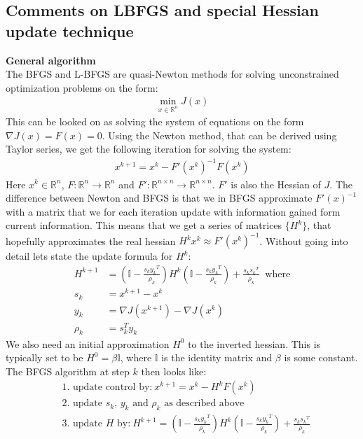 \documentclass[11pt,a4paper]{article}
\begin{document}
\subsection{Comments on LBFGS and special Hessian update technique}
\textbf{General algorithm}
\\
The BFGS and L-BFGS are quasi-Newton methods for solving unconstrained optimization problems on the form:
\begin{align*}
\min_{x \in \mathbb{R}^n} J(x)
\end{align*} 
This can be looked on as solving the system of equations on the form \\$\nabla J(x) = F(x)=0$. Using the Newton method, that can be derived using Taylor series, we get the following iteration for solving the system:
\begin{align*}
x^{k+1} = x^k - F'(x^k)^{-1}F(x^k)
\end{align*}
Here $x^k \in \mathbb{R}^n$, $F:\mathbb{R}^n \rightarrow \mathbb{R}^n$ and $F':\mathbb{R}^{n\times n} \rightarrow \mathbb{R}^{n\times n}$. $F'$ is also the Hessian of $J$. The difference between Newton and BFGS is that we in BFGS approximate $F'(x)^{-1}$ with a matrix that we for each iteration update with information gained form current information. This means that we get a series of matrices $\{H^k\}$, that hopefully approximates the real hessian $H^kx^k \approx F'(x^k)^{-1}$. Without going into detail lets state the update formula for $H^k$:
\begin{align*}
H^{k+1} &= (\mathbb{I} - \frac{s_k {y_k}^T}{\rho_k})H^k(\mathbb{I} - \frac{s_k {y_k}^T}{\rho_k}) + \frac{s_k {s_k}^T}{\rho_k} \ \text{ where} \\
s_k &= x^{k+1} - x^k \\
y_k &= \nabla J(x^{k+1}) - \nabla J(x^k) \\
\rho_k &= s_k^Ty_k
\end{align*} 
We also need an initial approximation $H^0$ to the inverted hessian. This is typically set to be $H^0 = \beta\mathbb{I}$, where $\mathbb{I}$ is the identity matrix and $\beta$ is some constant. The BFGS algorithm at step $k$ then looks like:
\begin{align*}
&\text{1. update control by:} \ x^{k+1}= x^{k} - H^kF(x^{k}) \\
&\text{2. update $s_k$, $y_k$ and $\rho_k$ as described above} \\
&\text{3. update $H$ by:} \ H^{k+1} = (\mathbb{I} - \frac{s_k {y_k}^T}{\rho_k})H^k(\mathbb{I} - \frac{s_k {y_k}^T}{\rho_k}) + \frac{s_k {s_k}^T}{\rho_k}
\end{align*}
\end{document}
